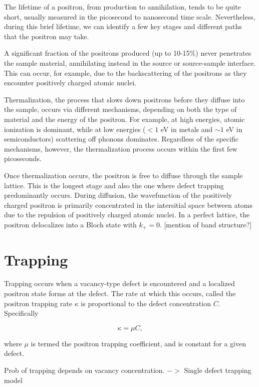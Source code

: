 The lifetime of a positron, from production to annihilation, tends to be quite short, usually measured in the picosecond to nanosecond time scale. Nevertheless, during this brief lifetime, we can identify a few key stages and different paths that the positron may take. 

A significant fraction of the positrons produced (up to 10-15\%) never penetrates the sample material, annihilating instead in the source or source-sample interface. This can occur, for example, due to the backscattering of the positrons as they encounter positively charged atomic nuclei. 

Thermalization, the process that slows down positrons before they diffuse into the sample, occurs via different mechanisms, depending on both the type of material and the energy of the positron. For example, at high energies, atomic ionization is dominant, while at low energies ($<1$ eV in metals and $\sim1$ eV in semiconductors) scattering off phonons dominates. Regardless of the specific mechanisms, however, the thermalization process occurs within the first few picoseconds.

Once thermalization occurs, the positron is free to diffuse through the sample lattice. This is the longest stage and also the one where defect trapping predominantly occurs. During diffusion, the wavefunction of the positively charged positron is primarily concentrated in the intersitial space between atoms due to the repulsion of positively charged atomic nuclei. In a perfect lattice, the positron delocalizes into a Bloch state with $k_+ = 0$. [mention of band structure?] 

\section{Trapping}

Trapping occurs when a vacancy-type defect is encountered and a localized positron state forms at the defect. The rate at which this occurs, called the positron trapping rate $\kappa$ is proportional to the defect concentration $C$. Specifically

\begin{equation}
    \kappa = \mu C,
\end{equation}

where $\mu$ is termed the positron trapping coefficient, and is constant for a given defect.

Prob of trapping depends on vacancy concentration. $->$ Single defect trapping model

